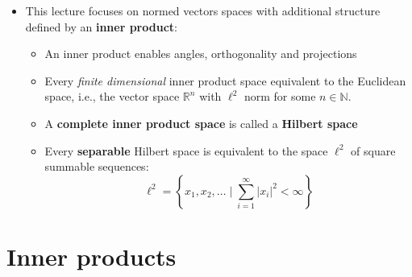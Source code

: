 \documentclass[11pt,twoside]{report}
\newcommand{\bbN}{{\mathbb{N}}}
\newcommand{\bbR}{{\mathbb{R}}}
\begin{document}
\begin{itemize}
\begin{itemize}
\end{itemize}

\item This lecture focuses on normed vectors spaces with additional structure defined by an \textbf{inner product}:
\begin{itemize}
\item An inner product enables  angles, orthogonality and projections
\item Every  \emph{finite dimensional} inner product space equivalent to the  Euclidean space, i.e., the vector space $\bbR^n$ with $\ell^2$ norm for some $n \in \bbN$. %
\item A \textbf{complete inner product space} is called a \textbf{Hilbert space}
\item Every \textbf{separable} Hilbert space is equivalent to the space $\ell^2$ of square summable sequences: %
\[
\ell^2 =\left \{ x_1, x_2,  \ldots  \mid \sum_{i=1}^\infty |x_i|^2 < \infty \right\}
\]
\end{itemize} 

\end{itemize}





\section{Inner products} 
\end{document}
